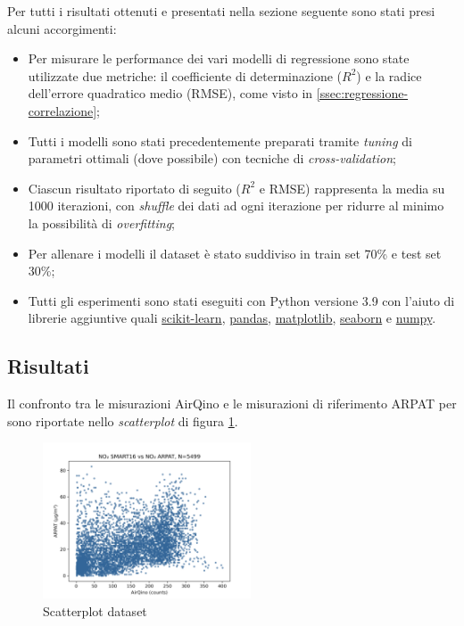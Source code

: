 Per tutti i risultati ottenuti e presentati nella sezione seguente sono stati presi alcuni accorgimenti:
\begin{itemize}
  \item Per misurare le performance dei vari modelli di regressione sono state utilizzate due metriche: il coefficiente di determinazione ($R^2$) e la radice dell'errore quadratico medio (RMSE), come visto in \ref{ssec:regressione-correlazione};
  \item Tutti i modelli sono stati precedentemente preparati tramite \textit{tuning} di parametri ottimali (dove possibile) con tecniche di \textit{cross-validation};
  \item Ciascun risultato riportato di seguito ($R^2$ e RMSE) rappresenta la media su 1000 iterazioni, con \textit{shuffle} dei dati ad ogni iterazione per ridurre al minimo la possibilità di \textit{overfitting};
  \item Per allenare i modelli il dataset è stato suddiviso in train set 70\% e test set 30\%;
  \item Tutti gli esperimenti sono stati eseguiti con Python versione 3.9 con l'aiuto di librerie aggiuntive quali \url{scikit-learn}, \url{pandas}, \url{matplotlib}, \url{seaborn} e \url{numpy}.
\end{itemize}

\subsection{Risultati }\label{ssec:risultati-no2}

Il confronto tra le misurazioni AirQino e le misurazioni di riferimento ARPAT per  sono riportate nello \textit{scatterplot} di figura \ref{fig:scatterplot_no2}.

\begin{figure}[H]
\centering
\includegraphics[width=0.55\textwidth,height=\textheight,keepaspectratio]{img/sc_no2.png}
\caption{Scatterplot dataset }
\label{fig:scatterplot_no2}
\end{figure}

